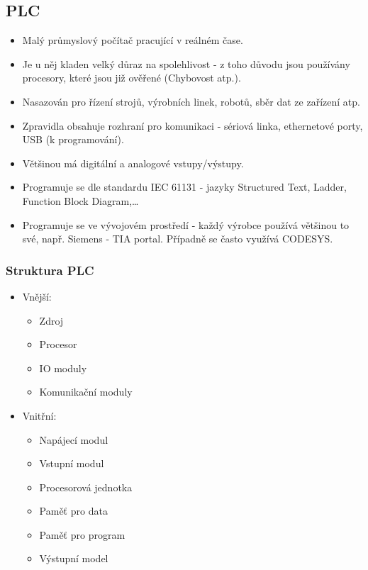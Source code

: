 \subsection{PLC}
\begin{itemize}
  \item Malý průmyslový počítač pracující v reálném čase.
  \item Je u něj kladen velký důraz na spolehlivost - z toho důvodu jsou používány procesory, které jsou již ověřené (Chybovost atp.). 
  \item Nasazován pro řízení strojů, výrobních linek, robotů, sběr dat ze zařízení atp.
  \item Zpravidla obsahuje rozhraní pro komunikaci - sériová linka, ethernetové porty, USB (k programování).
  \item Většinou má digitální a analogové vstupy/výstupy.
  \item Programuje se dle standardu IEC 61131 - jazyky Structured Text, Ladder, Function Block Diagram,\dots
  \item Programuje se ve vývojovém prostředí - každý výrobce používá většinou to své, např. Siemens - TIA portal. Případně se často využívá CODESYS.
\end{itemize}
\subsubsection*{Struktura PLC}
\begin{itemize}
  \item Vnější: \begin{itemize}
    \item Zdroj
    \item Procesor 
    \item IO moduly 
    \item Komunikační moduly
  \end{itemize}
  \item Vnitřní: \begin{itemize}
    \item Napájecí modul
    \item Vstupní modul
    \item Procesorová jednotka
    \item Paměť pro data
    \item Paměť pro program
    \item Výstupní model
  \end{itemize}
\end{itemize}

